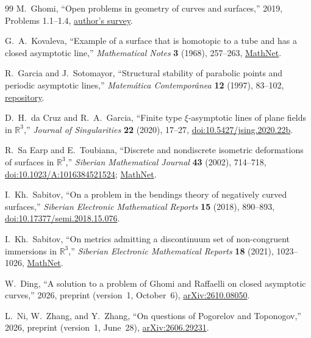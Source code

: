 \documentclass[11pt]{amsart}
\theoremstyle{definition}
\theoremstyle{remark}
\numberwithin{equation}{section}
\begin{document}
\begin{thebibliography}{99}
M.~Ghomi, ``Open problems in geometry of curves and surfaces,'' 2019,
Problems 1.1--1.4,
\href{https://ghomi.math.gatech.edu/Papers/op.pdf}{author's survey}.

G.~A.~Kovaleva, ``Example of a surface that is homotopic to a tube and has a
closed asymptotic line,'' \emph{Mathematical Notes} \textbf{3} (1968),
257--263, \href{https://www.mathnet.ru/eng/mzm6695}{MathNet}.

R.~Garcia and J.~Sotomayor, ``Structural stability of parabolic points and
periodic asymptotic lines,'' \emph{Matem\'atica Contempor\^anea}
\textbf{12} (1997), 83--102,
\href{https://repositorio.bc.ufg.br/items/02c6dfb8-0487-4267-a20d-4d97c54decf0}{repository}.

D.~H.~da Cruz and R.~A.~Garcia, ``Finite type $\xi$-asymptotic lines of plane
fields in $\mathbb R^3$,'' \emph{Journal of Singularities} \textbf{22} (2020),
17--27, \href{https://doi.org/10.5427/jsing.2020.22b}{doi:10.5427/jsing.2020.22b}.

R.~Sa Earp and E.~Toubiana, ``Discrete and nondiscrete isometric deformations
of surfaces in $\mathbb R^3$,'' \emph{Siberian Mathematical Journal}
\textbf{43} (2002), 714--718,
\href{https://doi.org/10.1023/A:1016384521524}{doi:10.1023/A:1016384521524};
\href{https://m.mathnet.ru/eng/smj1338}{MathNet}.

I.~Kh.~Sabitov, ``On a problem in the bendings theory of negatively curved
surfaces,'' \emph{Siberian Electronic Mathematical Reports} \textbf{15} (2018),
890--893,
\href{https://doi.org/10.17377/semi.2018.15.076}{doi:10.17377/semi.2018.15.076}.

I.~Kh.~Sabitov, ``On metrics admitting a discontinuum set of non-congruent
immersions in $\mathbb R^3$,'' \emph{Siberian Electronic Mathematical Reports}
\textbf{18} (2021), 1023--1026,
\href{https://www.mathnet.ru/eng/semr1418}{MathNet}.

W.~Ding, ``A solution to a problem of Ghomi and Raffaelli on closed
asymptotic curves,'' 2026, preprint (version~1, October~6),
\href{https://arxiv.org/abs/2610.08050}{arXiv:2610.08050}.

L.~Ni, W.~Zhang, and Y.~Zhang, ``On questions of Pogorelov and Toponogov,''
2026, preprint (version~1, June~28),
\href{https://arxiv.org/abs/2606.29231}{arXiv:2606.29231}.


\end{thebibliography}
\end{document}
